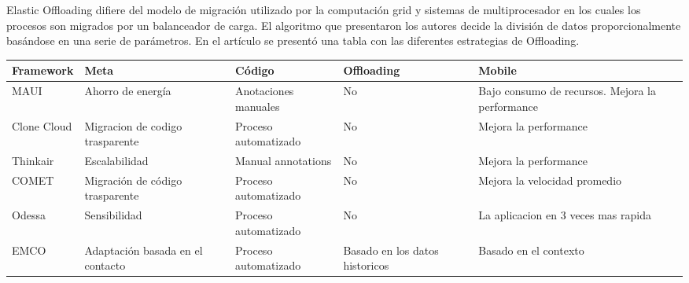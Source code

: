 Elastic Offloading difiere del modelo de migración utilizado por la computación grid y sistemas de multiprocesador en los cuales los procesos son migrados por un balanceador de carga. El algoritmo que presentaron los autores decide la división de datos proporcionalmente basándose en una serie de parámetros.
En el artículo se presentó una tabla con las diferentes estrategias de Offloading.
\begin{table}[t]
    \begin{center}
        \begin{tabular}{ | m{2cm} | m{} | m{} | m{2cm} | m{} |}
            \hline
            Framework   & Meta                             & Código               & Offloading                     & Mobile                                          \\ \hline
            MAUI        & Ahorro de energía                & Anotaciones manuales & No                             & Bajo consumo de recursos. Mejora la performance \\ \hline
            Clone Cloud & Migracion de codigo trasparente  & Proceso automatizado & No                             & Mejora la performance                           \\ \hline
            Thinkair    & Escalabilidad                    & Manual annotations   & No                             & Mejora la performance                           \\ \hline
            COMET       & Migración de código trasparente  & Proceso automatizado & No                             & Mejora la velocidad promedio                    \\ \hline
            Odessa      & Sensibilidad                     & Proceso automatizado & No                             & La aplicacion en 3 veces mas rapida             \\ \hline
            EMCO        & Adaptación basada en el contacto & Proceso automatizado & Basado en los datos historicos & Basado en el contexto                           \\ \hline
        \end{tabular}
    \end{center}
\end{table}



